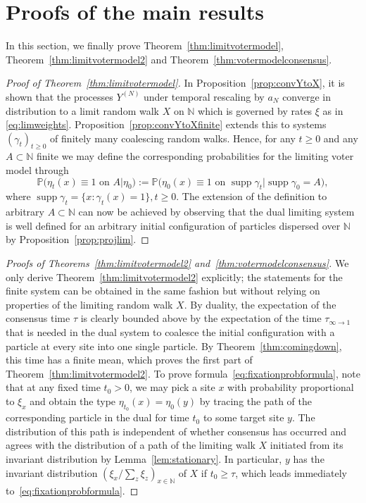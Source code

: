 \documentclass[11pt,a4paper]{scrartcl}
\numberwithin{equation}{section}
\theoremstyle{plain}
\theoremstyle{definition}
\theoremstyle{remark}
\DeclareMathOperator{\supp}{supp}
\newcommand{\bN}{\ensuremath{\mathbb{N}}}
\newcommand{\bP}{\ensuremath{\mathbb{P}}}
\begin{document}
\section{Proofs of the main results}
In this section, we finally prove Theorem~\ref{thm:limitvotermodel}, Theorem~\ref{thm:limitvotermodel2} and Theorem~\ref{thm:votermodelconsensus}.
\begin{proof}[Proof of Theorem~\ref{thm:limitvotermodel}]
In Proposition~\ref{prop:convYtoX}, it is shown that the processes $Y^{(N)}$ under temporal rescaling by $a_N$ converge in distribution to a limit random walk $X$ on $\bN$ which is governed by rates $\xi$ as in \eqref{eq:limweights}. Proposition~\ref{prop:convYtoXfinite} extends this to systems $(\gamma_t)_{t\geq 0}$ of finitely many coalescing random walks. Hence, for any $t\geq 0$ and any $A\subset \bN$ finite we may define the corresponding probabilities for the limiting voter model through
\begin{equation}\label{eq:duality2}
	\bP\big(\eta_t(x)\equiv 1 \text{ on }A\big| \eta_0\big):=\bP\big(\eta_0(x)\equiv 1 \text{ on }\supp \gamma_t\big| \supp \gamma_0 = A\big),
\end{equation}
where $\supp \gamma_t=\{x:\gamma_t(x)=1\}, t\geq 0.$ The extension of the definition to arbitrary $A\subset \bN$ can now be achieved by observing that the dual limiting system is well defined for an arbitrary initial configuration of particles dispersed over $\bN$ by Proposition~\ref{prop:projlim}.
\end{proof}
\begin{proof}[Proofs of Theorems~\ref{thm:limitvotermodel2} and~\ref{thm:votermodelconsensus}]
We only derive Theorem~\ref{thm:limitvotermodel2} explicitly; the statements for the finite system can be obtained in the same fashion but without relying on properties of the limiting random walk $X$. By duality, the expectation of the consensus time $\tau$ is clearly bounded above by the expectation of the time $\tau_{\infty\rightarrow 1}$ that is needed in the dual system to coalesce the initial configuration with a particle at every site into one single particle. By Theorem~\ref{thm:comingdown}, this time has a finite mean, which proves the first part of Theorem~\ref{thm:limitvotermodel2}. To prove formula~\eqref{eq:fixationprobformula}, note that at any fixed time $t_0>0$, we may pick a site $x$ with probability proportional to $\xi_x$ and obtain the type $\eta_{t_0}(x)=\eta_0(y)$ by tracing the path of the corresponding particle in the dual for time $t_0$ to some target site $y$. The distribution of this path is independent of whether consensus has occurred and agrees with the distribution of a path of the limiting walk $X$ initiated from its invariant distribution by Lemma~\ref{lem:stationary}. In particular, $y$ has the invariant distribution $(\xi_x/\sum_z\xi_z)_{x\in\bN}$ of $X$ if $t_0\geq \tau$, which leads immediately to~\eqref{eq:fixationprobformula}.
\end{proof}
\end{document}
